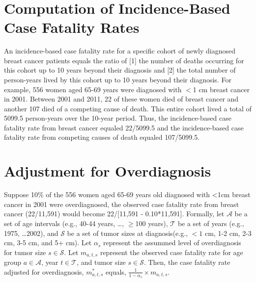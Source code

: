 \documentclass[11pt,letterpaper]{article}
\theoremstyle{plain}
\theoremstyle{remark}
\numberwithin{equation}{section}
\begin{document}
\blind \title{\bf \tit} \maketitle \fi


\thispagestyle{empty}
\setcounter{page}{0}



\newpage
\clearpage
 \setcounter{table}{0}  %
 \setcounter{figure}{0}  %
 \setcounter{page}{1}
 \renewcommand{\figurename}{Supplemental Figure}
 \renewcommand{\tablename}{Supplemental Table}
\appendix

\section{Computation of Incidence-Based Case Fatality Rates}
An incidence-based case fatality rate for a specific cohort of newly
diagnosed breast cancer patients equals the ratio of [1] the number of
deaths occurring for this cohort up to 10 years beyond their diagnosis
and [2] the total number of person-years lived by this cohort up to 10
years beyond their diagnosis.  For example, 556 women aged 65-69 years
were diagnosed with $<$1 cm breast cancer in 2001.  Between 2001 and
2011, 22 of these women died of breast cancer and another 107 died of
a competing cause of death.  This entire cohort lived a total of
5099.5 person-years over the 10-year period.  Thus, the
incidence-based case fatality rate from breast cancer equaled
22/5099.5 and the incidence-based case fatality rate from competing
causes of death equaled 107/5099.5.

\section{Adjustment for Overdiagnosis}
Suppose 10\% of the 556 women aged 65-69 years old diagnosed with <1cm
breast cancer in 2001 were overdiagnosed, the observed case fatality
rate from breast cancer (22/11,591) would become 22/[11,591 -
0.10*11,591].  Formally, let $\mathcal{A}$ be a set of age intervals
(e.g., 40-44 years, \dots, $\geq$100 years), $\mathcal{T}$ be a set of
years (e.g., 1975, \dots 2002), and $\mathcal{S}$ be a set of tumor
sizes at diagnosis(e.g., $<1$ cm, 1-2 cm, 2-3 cm, 3-5 cm, and 5+ cm).
Let $\alpha_s$ represent the assummed level of overdiagnosis for tumor
size $s\in\mathcal{S}$.  Let $m_{a,t,s}$ represent the observed case
fatality rate for age group $a \in \mathcal{A}$, year $t \in
\mathcal{T}$, and tumor size $s \in \mathcal{S}$.  Then, the case
fatality rate adjusted for overdiagnosis, $m^*_{a,t,s}$ equals,
$\frac{1}{1-\alpha_s} \times m_{a,t,s}$.
\end{document}
